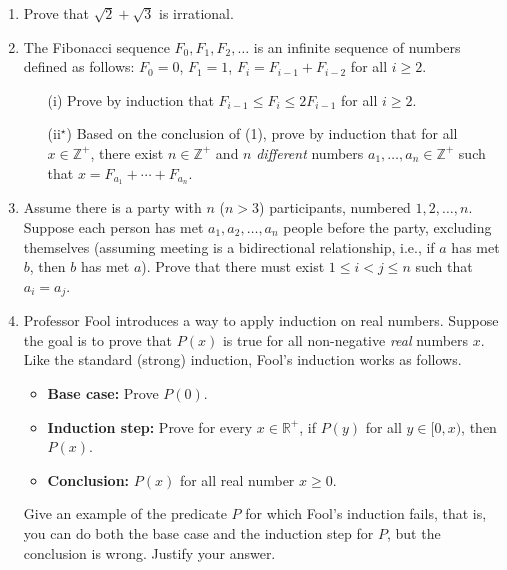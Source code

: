 \documentclass[11pt,twoside]{article}
\begin{document}
\begin{enumerate}
    \item Prove that $\sqrt{2} + \sqrt{3}$ is irrational.

    \item The Fibonacci sequence $F_0,F_1,F_2,\dots$ is an infinite sequence of numbers defined as follows: $F_0 = 0$, $F_1 = 1$, $F_i = F_{i-1}+F_{i-2}$ for all $i \geq 2$.

\begin{enumerate}
    \item[(i)] Prove by induction that $F_{i-1} \leq F_i \leq 2 F_{i-1}$ for all $i \geq 2$.
    \item[(ii$^\star$)] Based on the conclusion of (1), prove by induction that for all $x \in \mathbb{Z}^+$, there exist $n \in \mathbb{Z}^+$ and $n$ \textit{different} numbers $a_1,\dots,a_n \in \mathbb{Z}^+$ such that $x = F_{a_1}+ \cdots + F_{a_n}$.
\end{enumerate}

    \item Assume there is a party with \(n\) (\(n > 3\)) participants, numbered \(1, 2, \ldots, n\). Suppose each person has met \(a_1, a_2, \ldots, a_n\) people before the party, excluding themselves (assuming meeting is a bidirectional relationship, i.e., if \(a\) has met \(b\), then \(b\) has met \(a\)). Prove that there must exist \(1 \leq i < j \leq n\) such that \(a_i = a_j\).

    \item Professor Fool introduces a way to apply induction on real numbers.
    Suppose the goal is to prove that $P(x)$ is true for all non-negative \textit{real} numbers $x$.
    Like the standard (strong) induction, Fool's induction works as follows.
    \begin{itemize}
        \item \textbf{Base case:} Prove $P(0)$.
        \item \textbf{Induction step:} Prove for every $x \in \mathbb{R}^+$, if $P(y)$ for all $y \in [0,x)$, then $P(x)$.
        \smallskip
        \item \textbf{Conclusion:} $P(x)$ for all real number $x \geq 0$.
    \end{itemize}
    Give an example of the predicate $P$ for which Fool's induction fails, that is, you can do both the base case and the induction step for $P$, but the conclusion is wrong.
    Justify your answer.
\end{enumerate}
\end{document}
